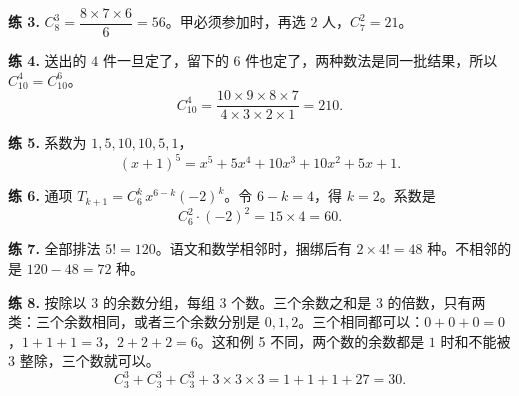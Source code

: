 \documentclass[11pt,a4paper,fontset=none]{ctexart}
\begin{document}
\textbf{练 3.}\quad
\(C_8^3=\dfrac{8\times 7\times 6}{6}=56\)。甲必须参加时，再选 \(2\) 人，\(C_7^2=21\)。

\textbf{练 4.}\quad
送出的 \(4\) 件一旦定了，留下的 \(6\) 件也定了，两种数法是同一批结果，所以 \(C_{10}^{4}=C_{10}^{6}\)。
\[
  C_{10}^{4}=\frac{10\times 9\times 8\times 7}{4\times 3\times 2\times 1}=210.
\]

\textbf{练 5.}\quad
系数为 \(1,5,10,10,5,1\)，
\[
  (x+1)^5=x^5+5x^4+10x^3+10x^2+5x+1.
\]

\textbf{练 6.}\quad
通项 \(T_{k+1}=C_6^k\,x^{6-k}(-2)^k\)。令 \(6-k=4\)，得 \(k=2\)。系数是
\[
  C_6^2\cdot(-2)^2=15\times 4=60.
\]

\textbf{练 7.}\quad
全部排法 \(5!=120\)。语文和数学相邻时，捆绑后有 \(2\times 4!=48\) 种。不相邻的是 \(120-48=72\) 种。

\textbf{练 8.}\quad
按除以 \(3\) 的余数分组，每组 \(3\) 个数。三个余数之和是 \(3\) 的倍数，只有两类：三个余数相同，或者三个余数分别是 \(0,1,2\)。三个相同都可以：\(0+0+0=0\)，\(1+1+1=3\)，\(2+2+2=6\)。这和例 5 不同，两个数的余数都是 \(1\) 时和不能被 \(3\) 整除，三个数就可以。
\[
  C_3^3+C_3^3+C_3^3+3\times 3\times 3=1+1+1+27=30.
\]
\end{document}
